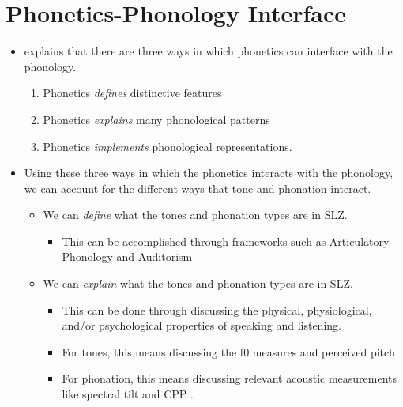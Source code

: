 \documentclass[12pt, letterpaper]{article}
\begin{document}
\section{Phonetics-Phonology Interface} \label{sec:Interface}
\begin{itemize}
	\item \citet{kingstonPhoneticsPhonologyInterface2007} explains that there are three ways in which phonetics can interface with the phonology. 
	\begin{enumerate}
		\item Phonetics \textit{defines} distinctive features
		\item Phonetics \textit{explains} many phonological patterns
		\item Phonetics \textit{implements} phonological representations. 
	\end{enumerate}

	\item Using these three ways in which the phonetics interacts with the phonology, we can account for the different ways that tone and phonation interact. 
	\begin{itemize}
		\item We can \textit{define} what the tones and phonation types are in SLZ.
			\begin{itemize}
			 	\item This can be accomplished through frameworks such as Articulatory Phonology \citep{browmanArticulatoryPhonologyOverview1992} and Auditorism \citep{kingstonPhoneticKnowledge1994}
			\end{itemize} 

		\item We can \textit{explain} what the tones and phonation types are in SLZ. 
		\begin{itemize}
			\item This can be done through discussing the physical, physiological, and/or psychological properties of speaking and listening.
			\item For tones, this means discussing the f0 measures and perceived pitch
			\item For phonation, this means discussing relevant acoustic measurements like spectral tilt and CPP \citep{garellekPhoneticsVoice2019}.
		\end{itemize}

	\end{itemize}


\end{itemize}
\end{document}
